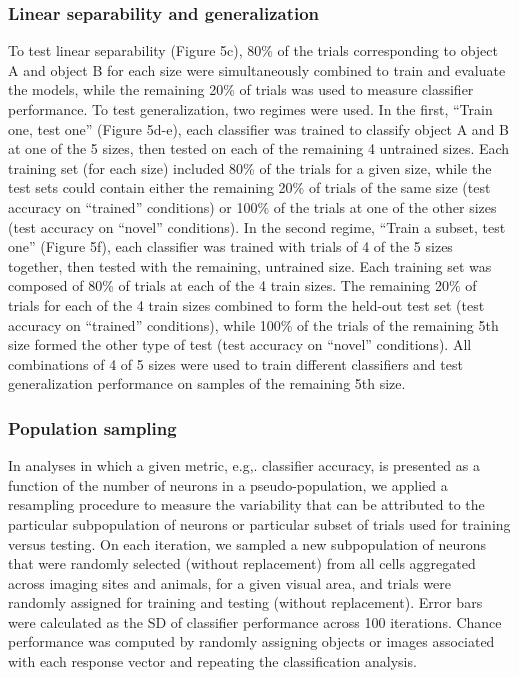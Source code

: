 \subsubsection{Linear separability and generalization}
To test linear separability (Figure 5c), 80\% of the trials corresponding to object A and object B for each size were simultaneously combined to train and evaluate the models, while the remaining 20\% of trials was used to measure classifier performance. To test generalization, two regimes were used. In the first, “Train one, test one” (Figure 5d-e), each classifier was trained to classify object A and B at one of the 5 sizes, then tested on each of the remaining 4 untrained sizes. Each training set (for each size) included 80\% of the trials for a given size, while the test sets could contain either the remaining 20\% of trials of the same size (test accuracy on “trained” conditions) or 100\% of the trials at one of the other sizes (test accuracy on “novel” conditions). 
In the second regime, “Train a subset, test one” (Figure 5f),  each classifier was trained with trials of  4 of the 5 sizes together, then tested with the remaining, untrained size. Each training set was composed of 80\% of trials at each of the 4 train sizes. The remaining 20\% of trials for each of the 4 train sizes combined to form the held-out test set (test accuracy on “trained” conditions), while 100\% of the trials of the remaining 5th size formed the other type of test (test accuracy on “novel” conditions). All combinations of 4 of 5 sizes were used to train different classifiers and test generalization performance on samples of the remaining 5th size.

\subsubsection{Population sampling}
In analyses in which a given metric, e.g,. classifier accuracy, is presented as a function of the number of neurons in a pseudo-population, we applied a resampling procedure to measure the variability that can be attributed to the particular subpopulation of neurons or particular subset of trials used for training versus testing. On each iteration, we sampled a new subpopulation of neurons that were randomly selected (without replacement) from all cells aggregated across imaging sites and animals, for a given visual area, and trials were randomly assigned for training and testing (without replacement). Error bars were calculated as the SD of classifier performance across 100 iterations. Chance performance was computed by randomly assigning objects or images associated with each response vector and repeating the classification analysis.


